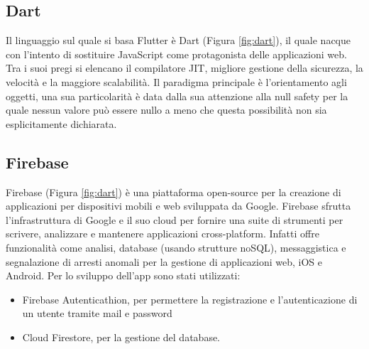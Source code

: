 \subsection{Dart}
Il linguaggio sul quale si basa Flutter è Dart (Figura \ref{fig:dart}), il quale nacque con l’intento di sostituire JavaScript come protagonista delle applicazioni web.\newline
Tra i suoi pregi si elencano il compilatore JIT, migliore gestione della sicurezza, la velocità e la maggiore scalabilità.\newline
Il paradigma principale è l’orientamento agli oggetti, una sua particolarità è data dalla sua attenzione alla null safety per la quale nessun valore può essere nullo a meno che questa possibilità non sia esplicitamente dichiarata.\newline

\subsection{Firebase}
Firebase (Figura \ref{fig:dart}) è una piattaforma open-source per la creazione di applicazioni per dispositivi mobili e web sviluppata da Google.\newline
Firebase sfrutta l'infrastruttura di Google e il suo cloud per fornire una suite di strumenti per scrivere, analizzare e mantenere applicazioni cross-platform.\newline
Infatti offre funzionalità come analisi, database (usando strutture noSQL), messaggistica e segnalazione di arresti anomali per la gestione di applicazioni web, iOS e Android.\newline
Per lo sviluppo dell'app sono stati utilizzati:
\begin{itemize}
    \item Firebase Autenticathion, per permettere la registrazione e l'autenticazione di un utente tramite mail e password
    \item Cloud Firestore, per la gestione del database.
\end{itemize}

